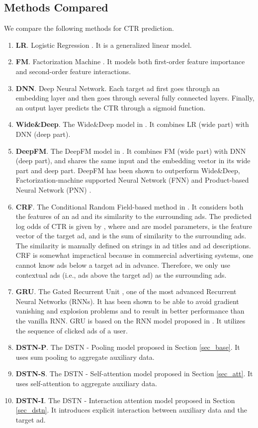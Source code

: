\documentclass[sigconf]{acmart}
\begin{document}
\subsection{Methods Compared}
We compare the following methods for CTR prediction.
\begin{enumerate}
\item \textbf{LR}. Logistic Regression \cite{bishop2006pattern}. It is a generalized linear model.
\item \textbf{FM}. Factorization Machine \cite{rendle2010factorization}. It models both first-order feature importance and second-order feature interactions.
\item \textbf{DNN}. Deep Neural Network. Each target ad first goes through an embedding layer and then goes through several fully connected layers. Finally, an output layer predicts the CTR through a sigmoid function.
\item \textbf{Wide\&Deep}. The Wide\&Deep model in \cite{cheng2016wide}. It combines LR (wide part) with DNN (deep part).
\item \textbf{DeepFM}. The DeepFM model in \cite{guo2017deepfm}. It combines FM (wide part) with DNN (deep part), and shares the same input and the embedding vector in its wide part and deep part. DeepFM has been shown to outperform Wide\&Deep, Factorization-machine supported Neural Network (FNN) \cite{zhang2016deep} and Product-based Neural Network (PNN) \cite{qu2016product}.
\item \textbf{CRF}. The Conditional Random Field-based method in \cite{xiong2012relational}. It considers both the features of an ad
    and its similarity to the surrounding ads. The predicted log odds of CTR is given by , where  and  are model parameters,  is the feature vector of the target ad, and  is the sum of similarity to the surrounding ads. The similarity is manually defined on strings in ad titles and ad descriptions. CRF is somewhat impractical because in commercial advertising systems, one cannot know ads below a target ad in advance. Therefore, we only use contextual ads (i.e., ads above the target ad) as the surrounding ads.
\item \textbf{GRU}. The Gated Recurrent Unit \cite{chung2014empirical}, one of the most advanced Recurrent Neural Networks (RNNs). It has been shown to be able to avoid gradient vanishing and explosion problems and to result in better performance than the vanilla RNN. GRU is based on the RNN model proposed in \cite{zhang2014sequential}. It utilizes the sequence of clicked ads of a user.
\item \textbf{DSTN-P}. The DSTN - Pooling model proposed in Section \ref{sec_base}. It uses sum pooling to aggregate auxiliary data.
\item \textbf{DSTN-S}. The DSTN - Self-attention model proposed in Section \ref{sec_att}. It uses self-attention to aggregate auxiliary data.
\item \textbf{DSTN-I}. The DSTN - Interaction attention model proposed in Section \ref{sec_dstn}. It introduces explicit interaction between auxiliary data and the target ad.
\end{enumerate}
\end{document}
